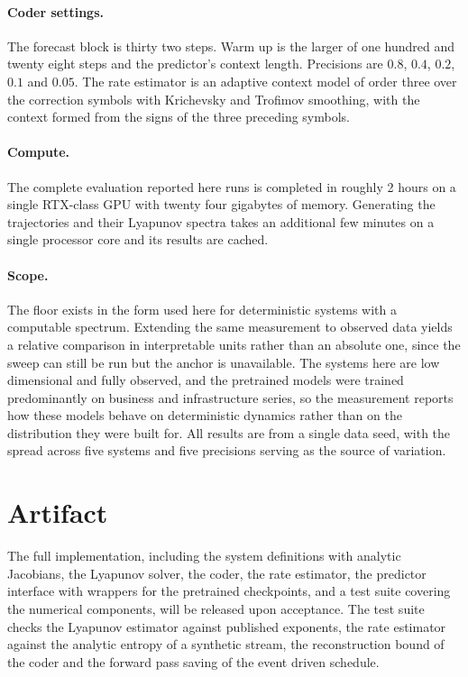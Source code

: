\documentclass{article}
\begin{document}
\paragraph{Coder settings.}
The forecast block is thirty two steps. Warm up is the larger of one hundred and twenty eight steps and the predictor's context length. Precisions are $0.8$, $0.4$, $0.2$, $0.1$ and $0.05$. The rate estimator is an adaptive context model of order three over the correction symbols with Krichevsky and Trofimov smoothing, with the context formed from the signs of the three preceding symbols.

\paragraph{Compute.}
The complete evaluation reported here runs is completed in roughly 2 hours on a single RTX-class GPU with twenty four gigabytes of memory. Generating the trajectories and their Lyapunov spectra takes an additional few minutes on a single processor core and its results are cached.

\paragraph{Scope.}
The floor exists in the form used here for deterministic systems with a computable spectrum. Extending the same measurement to observed data yields a relative comparison in interpretable units rather than an absolute one, since the sweep can still be run but the anchor is unavailable. The systems here are low dimensional and fully observed, and the pretrained models were trained predominantly on business and infrastructure series, so the measurement reports how these models behave on deterministic dynamics rather than on the distribution they were built for. All results are from a single data seed, with the spread across five systems and five precisions serving as the source of variation.

\section{Artifact}

The full implementation, including the system definitions with analytic Jacobians, the Lyapunov solver, the coder, the rate estimator, the predictor interface with wrappers for the pretrained checkpoints, and a test suite covering the numerical components, will be released upon acceptance. The test suite checks the Lyapunov estimator against published exponents, the rate estimator against the analytic entropy of a synthetic stream, the reconstruction bound of the coder and the forward pass saving of the event driven schedule.
\end{document}
